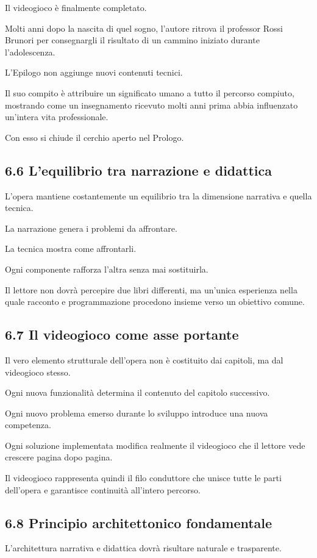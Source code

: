 \documentclass{article}
\begin{document}
Il videogioco è finalmente completato.

Molti anni dopo la nascita di quel sogno, l'autore ritrova il professor Rossi Brunori per consegnargli il risultato di
un cammino iniziato durante l'adolescenza.

L'Epilogo non aggiunge nuovi contenuti tecnici.

Il suo compito è attribuire un significato umano a tutto il percorso compiuto, mostrando come un insegnamento ricevuto
molti anni prima abbia influenzato un'intera vita professionale.

Con esso si chiude il cerchio aperto nel Prologo.

\subsection[6.6 L{}'equilibrio tra narrazione e didattica]{6.6 L'equilibrio tra narrazione e didattica}
L'opera mantiene costantemente un equilibrio tra la dimensione narrativa e quella tecnica.

La narrazione genera i problemi da affrontare.

La tecnica mostra come affrontarli.

Ogni componente rafforza l'altra senza mai sostituirla.

Il lettore non dovrà percepire due libri differenti, ma un'unica esperienza nella quale racconto e programmazione
procedono insieme verso un obiettivo comune.

\subsection{6.7 Il videogioco come asse portante}
Il vero elemento strutturale dell'opera non è costituito dai capitoli, ma dal videogioco stesso.

Ogni nuova funzionalità determina il contenuto del capitolo successivo.

Ogni nuovo problema emerso durante lo sviluppo introduce una nuova competenza.

Ogni soluzione implementata modifica realmente il videogioco che il lettore vede crescere pagina dopo pagina.

Il videogioco rappresenta quindi il filo conduttore che unisce tutte le parti dell'opera e garantisce continuità
all'intero percorso.

\subsection{6.8 Principio architettonico fondamentale}
L'architettura narrativa e didattica dovrà risultare naturale e trasparente.
\end{document}
